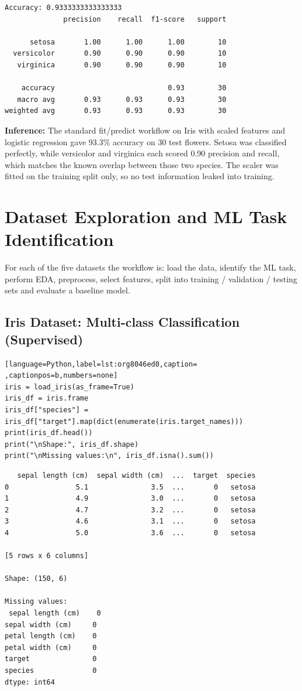 \documentclass[11pt]{article}
\begin{document}
\begin{verbatim}
Accuracy: 0.9333333333333333
              precision    recall  f1-score   support

      setosa       1.00      1.00      1.00        10
  versicolor       0.90      0.90      0.90        10
   virginica       0.90      0.90      0.90        10

    accuracy                           0.93        30
   macro avg       0.93      0.93      0.93        30
weighted avg       0.93      0.93      0.93        30
\end{verbatim}

\textbf{Inference:} The standard fit/predict workflow on Iris with scaled features and logistic regression gave
93.3\% accuracy on 30 test flowers. Setosa was classified perfectly, while versicolor and
virginica each scored 0.90 precision and recall, which matches the known overlap between
those two species. The scaler was fitted on the training split only, so no test information
leaked into training.

\section*{Dataset Exploration and ML Task Identification}
\label{sec:org076cd2f}


For each of the five datasets the workflow is: load the data, identify the ML task, perform
EDA, preprocess, select features, split into training / validation / testing sets and
evaluate a baseline model.

\subsection*{Iris Dataset: Multi-class Classification (Supervised)}
\label{sec:orgbd1ddf6}

\begin{lstlisting}[language=Python,label=lst:org8046ed0,caption= ,captionpos=b,numbers=none]
iris = load_iris(as_frame=True)
iris_df = iris.frame
iris_df["species"] = iris_df["target"].map(dict(enumerate(iris.target_names)))
print(iris_df.head())
print("\nShape:", iris_df.shape)
print("\nMissing values:\n", iris_df.isna().sum())
\end{lstlisting}

\begin{verbatim}
   sepal length (cm)  sepal width (cm)  ...  target  species
0                5.1               3.5  ...       0   setosa
1                4.9               3.0  ...       0   setosa
2                4.7               3.2  ...       0   setosa
3                4.6               3.1  ...       0   setosa
4                5.0               3.6  ...       0   setosa

[5 rows x 6 columns]

Shape: (150, 6)

Missing values:
 sepal length (cm)    0
sepal width (cm)     0
petal length (cm)    0
petal width (cm)     0
target               0
species              0
dtype: int64
\end{verbatim}
\end{document}

